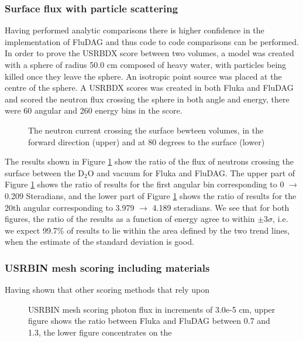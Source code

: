 \documentclass{anstrans}
\begin{document}
\subsubsection*{Surface flux with particle scattering}
Having performed analytic comparisons there is higher confidence in the implementation of FluDAG and thus code to 
code comparisons can be performed. In order to prove the USRBDX score between two volumes, a model was created with
a sphere of radius 50.0 cm composed of heavy water, with particles being killed once they leave the sphere. An isotropic point source was placed at the centre of the sphere. A USRBDX scores was created in both Fluka and FluDAG and scored the neutron flux crossing the sphere in both angle and energy, there were 60 angular and 260 energy bins in the score. 
\begin{figure}[h!]
	\begin{center}
		\caption{The neutron current crossing the surface bewteen volumes, in the 
		forward direction (upper) and at 80 degrees to the surface (lower)}
	\end{center}
\label{mat_usrbdx}
\end{figure}
The results shown in Figure \ref{mat_usrbdx} show the ratio of the flux of neutrons crossing the surface between the D$_2$O and vacuum for Fluka and FluDAG. The upper part of Figure \ref{mat_usrbdx} shows the ratio of results for the first angular bin corresponding to 0 $\to$ 0.209 Steradians, and the lower part of Figure \ref{mat_usrbdx} shows the ratio of results for the 20th angular corresponding to 3.979 $\to$ 4.189 steradians. We see that for both figures, the ratio of the results as a function of energy agree to within $\pm 3\sigma$, i.e. we expect 99.7\% of results to lie within the area defined by the two trend lines, when the estimate of the standard deviation is good.

\subsubsection*{USRBIN mesh scoring including materials}
Having shown that other scoring methods that rely upon 
\begin{figure}
	\begin{center}
		\caption{USRBIN mesh scoring photon flux in increments of 3.0e-5 cm, upper figure shows the ratio between Fluka and FluDAG between 0.7 and 1.3, the lower figure concentrates on the }
	\end{center}
\end{figure}
\end{document}
